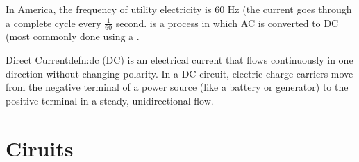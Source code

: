 In America, the frequency of utility electricity is 60 Hz (the current goes through a complete cycle every $\frac{1}{60}$ second.  is a process in which AC is converted to DC (most commonly done using a .

\begin{defn}{Direct Current}{defn:dc}
 (DC) is an electrical current that flows continuously in one direction without changing polarity. In a DC circuit, electric charge carriers move from the negative terminal of a power source (like a battery or generator) to the positive terminal in a steady, unidirectional flow.
\end{defn}





\section{Ciruits}

